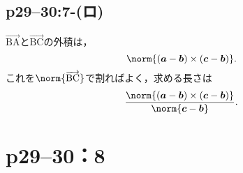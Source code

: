 \subsection*{p29--30:7-(ロ)}

\begin{tanswer}
  $ \overrightarrow{\mathrm{BA}}$と$\overrightarrow{\mathrm{BC}}$の外積は，
  \[
    \norm{(\bm{a}-\bm{b})\times(\bm{c}-\bm{b})}.
  \]
  これを$\norm{\overrightarrow{\mathrm{BC}}}$で割ればよく，求める長さは
  \[
    \frac{\norm{(\bm{a}-\bm{b})\times(\bm{c}-\bm{b})}}{\norm{\bm{c}-\bm{b}}}.
  \]
\end{tanswer}

\section*{p29--30：8}
